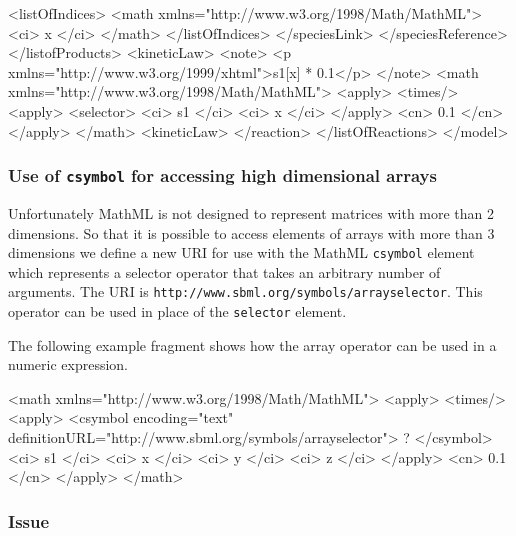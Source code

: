 \documentclass{cekarticle}
\begin{document}
\begin{example}
                        <listOfIndices>
                            <math xmlns="http://www.w3.org/1998/Math/MathML">
                                <ci> x </ci>
                            </math>
                        </listOfIndices>
                    </speciesLink>
                </speciesReference>
             </listofProducts>
            <kineticLaw>
                <note>
                    <p xmlns="http://www.w3.org/1999/xhtml">s1[x] * 0.1</p>
                </note>
                <math xmlns="http://www.w3.org/1998/Math/MathML">
                    <apply>
                        <times/>
                        <apply>
                            <selector>
                            <ci> s1 </ci>
                            <ci> x </ci>
                        </apply>
                        <cn> 0.1 </cn>
                    </apply>
                </math>
            <kineticLaw>
        </reaction>
    </listOfReactions>
</model>
\end{example}

\subsubsection{Use of \texttt{csymbol} for accessing high dimensional arrays}

Unfortunately MathML is not designed to represent matrices with more than 2 dimensions.
So that it is possible to access elements of arrays with more than 3 dimensions we
define a new URI for use with the MathML \texttt{csymbol} element which represents a selector
operator that takes an arbitrary number of arguments.  The URI is
\texttt{http://www.sbml.org/symbols/arrayselector}. This operator can be used in place 
of the \texttt{selector} element.

The following example fragment shows how the array operator can be used in
a numeric expression.  

\begin{example}
<math xmlns="http://www.w3.org/1998/Math/MathML">
    <apply>
        <times/>
        <apply>
            <csymbol
                encoding="text" 
                definitionURL="http://www.sbml.org/symbols/arrayselector">
                ?
            </csymbol>
            <ci> s1 </ci>
            <ci> x </ci>
            <ci> y </ci>
            <ci> z </ci>
        </apply>
        <cn> 0.1 </cn>
    </apply>
</math>
\end{example}

\subsubsection{Issue}
\end{document}
